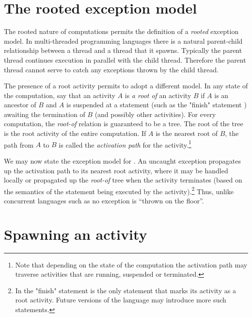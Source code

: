 
\section{The \Xten{} rooted exception model}
\label{ExceptionModel}

The rooted nature of \Xten{} computations permits the definition of a
{\em rooted} exception model. In multi-threaded programming languages
there is a natural parent-child relationship between a thread and a
thread that it spawns. Typically the parent thread continues execution
in parallel with the child thread. Therefore the parent thread cannot
serve to catch any exceptions thrown by the child thread. 

The presence of a root activity permits \Xten{} to adopt a different
model.  In any state of the computation, say that an activity $A$ is
{\em a root of} an activity $B$ if $A$ is an ancestor of $B$ and $A$
is suspended at a statement (such as the \xcd"finish" statement
) awaiting the termination of $B$ (and possibly other
activities). For every \Xten{} computation, the
\emph{root-of} relation
is guaranteed to be a tree. The root of the tree is the root activity
of the entire computation. If $A$ is the nearest root of $B$, the path
from $A$ to $B$ is called the {\em activation path} for the
activity.\footnote{Note that depending on the state of the computation
the activation path may traverse activities that are running,
suspended or terminated.}

We may now state the exception model for \Xten.  An uncaught exception
propagates up the activation path to its nearest root activity, where
it may be handled locally or propagated up the \emph{root-of} tree when
the activity terminates (based on the semantics of the statement being
executed by the activity).\footnote{In \XtenCurrVer{} the \xcd"finish"
statement is the only statement that marks its activity as a root
activity. Future versions of the language may introduce more such
statements.}  Thus, unlike concurrent languages such as \java{} no
exception is ``thrown on the floor''.

\section{Spawning an activity}\label{AsynchronousActivity}\label{AsyncActivity}

